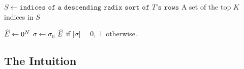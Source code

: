\begin{algorithm}
	\caption{$\texttt{sort-top-K(T)}$}\label{alg:sort-top-k}
	\BlankLine
	$S \gets \texttt{indices of a descending radix sort of $T$'s rows}$\;
	\BlankLine
	\Return A set of the top $K$ indices in $S$\;
\end{algorithm}

\begin{algorithm}
	\caption{$\texttt{probabilistic-set-flip($E$)}$}\label{alg:pfm}
	$\widehat{E} \gets 0^{N}$\;
	$\sigma \gets \sigma_0$\;
		\Return $\widehat{E}$ if $|\sigma| = 0$, $\bot$ otherwise.
\end{algorithm}

\subsection{The Intuition}
